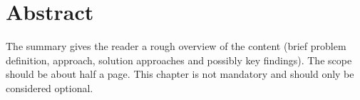 \section*{Abstract} %

The summary gives the reader a rough overview of the content (brief problem definition, approach, solution approaches and possibly key findings). The scope should be about half a page. This chapter is not mandatory and should only be considered optional.

